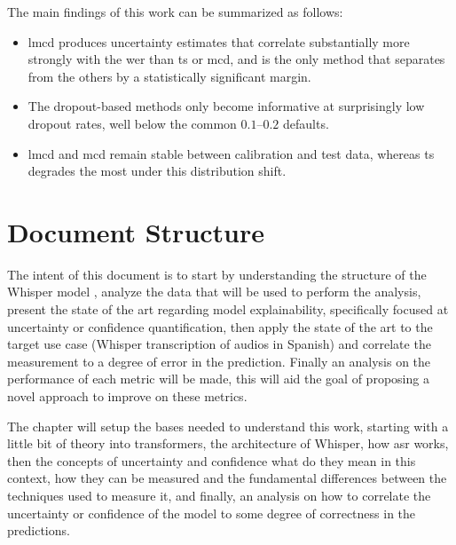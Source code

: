 The main findings of this work can be summarized as follows:
\begin{itemize}
    \item \acrshort{lmcd} produces uncertainty estimates that correlate substantially more strongly with the \acrshort{wer} than \acrshort{ts} or \acrshort{mcd}, and is the only method that separates from the others by a statistically significant margin.
    \item The dropout-based methods only become informative at surprisingly low dropout rates, well below the common $0.1$--$0.2$ defaults.
    \item \acrshort{lmcd} and \acrshort{mcd} remain stable between calibration and test data, whereas \acrshort{ts} degrades the most under this distribution shift.
\end{itemize}




\section{Document Structure}

The intent of this document is to start by understanding the structure of the Whisper model \cite{radford2023robust}, analyze the data that will be used to perform the analysis, present the state of the art regarding model explainability, specifically focused at uncertainty or confidence quantification, then apply the state of the art to the target use case (Whisper transcription of audios in Spanish) and correlate the measurement to a degree of error in the prediction. Finally an analysis on the performance of each metric will be made, this will aid the goal of proposing a novel approach to improve on these metrics.


The  chapter will setup the bases needed to understand this work, starting with a little bit of theory into transformers, the architecture of Whisper, how \acrshort{asr} works, then the concepts of uncertainty and confidence what do they mean in this context, how they can be measured and the fundamental differences between the techniques used to measure it, and finally, an analysis on how to correlate the uncertainty or confidence of the model to some degree of correctness in the predictions.

